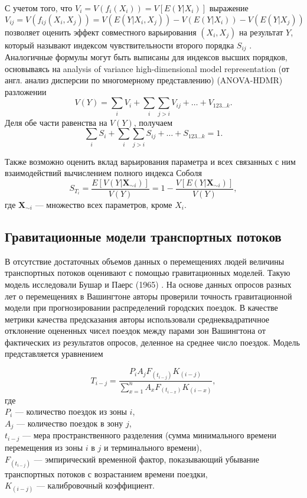 \documentclass[a4paper,12pt]{article} %
\begin{document}
С учетом того, что $V_i=V(f_i(X_i))=V[E(Y|X_i)]$ выражение
\begin{displaymath}
V_{ij}=V(f_{ij}(X_i,X_j))=V(E(Y|X_i,X_j))-V(E(Y|X_i))-V(E(Y|X_j))
\end{displaymath}
позволяет оценить эффект совместного варьирования $(X_i,X_j)$ на результат $Y$, который называют индексом чувствительности второго порядка $S_{ij}$ \cite{box1978statistics}. Аналогичные формулы могут быть выписаны для индексов высших порядков, основываясь на analysis of variance high-dimensional model representation (от англ. анализ дисперсии по многомерному представлению) (ANOVA-HDMR) разложении
\begin{displaymath}
V(Y)=\sum\limits_i V_i + \sum\limits_i \sum\limits_{j>i} V_{ij}+\ldots +V_{123\ldots k}.
\end{displaymath}
Деля обе части равенства на $V(Y)$, получаем
\begin{displaymath}
\sum\limits_i S_i + \sum\limits_i \sum\limits_{j>i} S_{ij}+\ldots +S_{123\ldots k}=1.
\end{displaymath}

Также возможно оценить вклад варьирования параметра и всех связанных с ним взаимодействий вычислением полного индекса Соболя
\begin{displaymath}
S_{T_i}=\frac{E[V(Y|\bm{X}_{\sim i})]}{V(Y)}=1-\frac{V[E(Y|\bm{X}_{\sim i})]}{V(Y)},
\end{displaymath}
где $\bm{X}_{\sim i}$ --- множество всех параметров, кроме $X_i$.
\subsection{Гравитационные модели транспортных потоков}
В отсутствие достаточных объемов данных о перемещениях людей величины транспортных потоков оценивают с помощью гравитационных моделей. Такую модель исследовали Бушар и Паерс (1965) \cite{bouchard1965use}. На основе данных опросов разных лет о перемещениях в Вашингтоне авторы проверили точность гравитационной модели при прогнозировании распределений городских поездок. В качестве метрики качества предсказания авторы использовали среднеквадратичное отклонение оцененных чисел поездок между парами зон Вашингтона от фактических из результатов опросов, деленное на среднее число поездок. Модель представляется уравнением

\begin{displaymath}
T_{i-j}=\frac{P_iA_jF_{(t_{i-j})}K_{(i-j)}}{\sum\limits_{x=1}^nA_xF_{(t_{i-x})}K_{(i-x)}},
\end{displaymath}
где \\ $P_i$ --- количество поездок из зоны $i$, \\ $A_j$ --- количество поездок в зону $j$, \\ $t_{i-j}$ --- мера пространственного разделения (сумма минимального времени перемещения из зоны $i$ в $j$ и терминального времени), \\ $F_{(t_{i-j})}$ --- эмпирический временной фактор, показывающий убывание транспортных потоков с возрастанием времени поездки, \\ $K_{(i-j)}$ --- калибровочный коэффициент.
\end{document}
